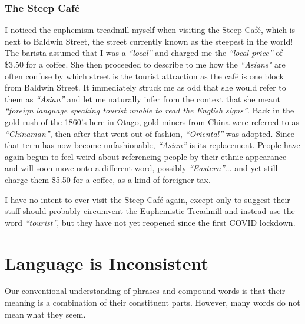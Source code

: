 \subsubsection{The Steep Caf{\'e}}
I noticed the euphemism treadmill myself when visiting the Steep Caf{\'e}, which is next to Baldwin Street, the street currently known as the steepest in the world! The barista assumed that I was a \textit{``local''} and charged me the \textit{``local price''} of \$3.50 for a coffee. She then proceeded to describe to me how the \textit{``Asians"} are often confuse by which street is the tourist attraction as the caf{\'e} is one block from Baldwin Street. It immediately struck me as odd that she would refer to them as \textit{``Asian''} and let me naturally infer from the context that she meant \textit{``foreign language speaking tourist unable to read the English signs''}. Back in the gold rush of the 1860's here in Otago, gold miners from China were referred to as \textit{``Chinaman''}, then after that went out of fashion, \textit{``Oriental''} was adopted. Since that term has now become unfashionable, \textit{``Asian''} is its replacement. People have again begun to feel weird about referencing people by their ethnic appearance and will soon move onto a different word, possibly \textit{``Eastern''}... and yet still charge them \$5.50 for a coffee, as a kind of foreigner tax.

I have no intent to ever visit the Steep Caf{\'e} again, except only to suggest their staff should probably circumvent the Euphemistic Treadmill and instead use the word \textit{``tourist''}, but they have not yet reopened since the first COVID lockdown.





\section{Language is Inconsistent}
Our conventional understanding of phrases and compound words is that their meaning is a combination of their constituent parts. However, many words do not mean what they seem.

